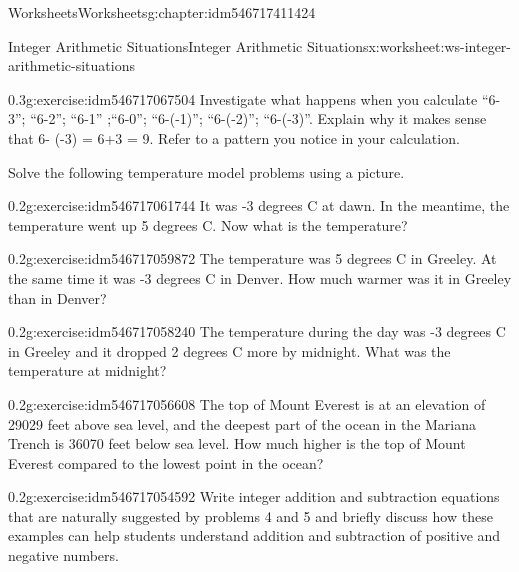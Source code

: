 \documentclass[twoside,11pt,]{book}
\begin{document}
\begin{chapterptx}{Worksheets}{}{Worksheets}{}{}{g:chapter:idm546717411424}
\begin{worksheet-section-numberless}{Integer Arithmetic Situations}{}{Integer Arithmetic Situations}{}{}{x:worksheet:ws-integer-arithmetic-situations}
\begin{introduction}{}
\end{introduction}%
\begin{divisionexercise}{1}{}{0.3}{g:exercise:idm546717067504}%
Investigate what happens when you calculate ``6-3'';  ``6-2'';  ``6-1'' ;``6-0''; ``6-(-1)'';     ``6-(-2)''; ``6-(-3)''.  Explain why it makes sense that 6- (-3) = 6+3 = 9.   Refer to a pattern you notice in your calculation.%
\end{divisionexercise}%
\begin{introduction}{}%
Solve the following temperature model problems using a picture.%
\end{introduction}%
\begin{divisionexercise}{2}{}{0.2}{g:exercise:idm546717061744}%
It was -3 degrees C at dawn. In the meantime, the temperature went up 5 degrees C. Now what is the temperature?%
\end{divisionexercise}%
\clearpage
\begin{divisionexercise}{3}{}{0.2}{g:exercise:idm546717059872}%
The temperature was 5 degrees C in Greeley. At the same time it was -3 degrees C in Denver. How much warmer was it in Greeley than in Denver?%
\end{divisionexercise}%
\begin{divisionexercise}{4}{}{0.2}{g:exercise:idm546717058240}%
The temperature during the day was -3 degrees C in Greeley and it dropped 2 degrees C more by midnight. What was the temperature at midnight?%
\end{divisionexercise}%
\begin{divisionexercise}{5}{}{0.2}{g:exercise:idm546717056608}%
The top of Mount Everest is at an elevation of 29029 feet above sea level, and the deepest part of the ocean in the Mariana Trench is 36070 feet below sea level.  How much higher is the top of Mount Everest compared to the lowest point in the ocean?%
\end{divisionexercise}%
\clearpage
\begin{divisionexercise}{6}{}{0.2}{g:exercise:idm546717054592}%
Write integer addition and subtraction equations that are naturally suggested by problems 4 and 5 and briefly discuss how these examples can help students understand addition and subtraction of positive and negative numbers.%
\end{divisionexercise}%
\end{worksheet-section-numberless}
\restoregeometry
\end{chapterptx}
\end{document}
